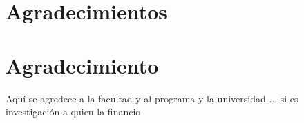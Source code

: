 \documentclass[12pt,journal,compsoc]{IEEEtran}
\begin{document}


\ifCLASSOPTIONcompsoc
  \section*{Agradecimientos}
\else
  \section*{Agradecimiento}
\fi


Aquí se agredece a la facultad y al programa y la universidad ... si es 
investigación a quien la financio 


\ifCLASSOPTIONcaptionsoff
  \newpage
\fi




 

\end{document}
